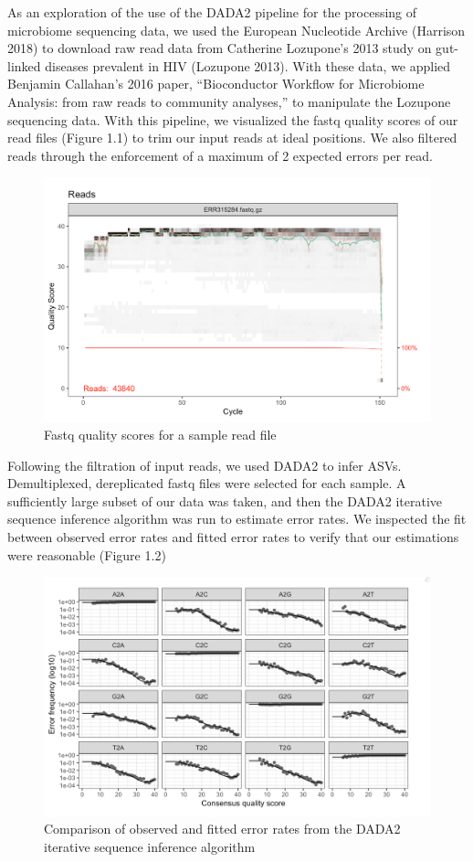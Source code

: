 \documentclass[12pt,twoside]{dukestatscithesis}
\begin{document}
As an exploration of the use of the DADA2 pipeline for the processing of
microbiome sequencing data, we used the European Nucleotide Archive
(Harrison 2018) to download raw read data from Catherine Lozupone's 2013
study on gut-linked diseases prevalent in HIV (Lozupone 2013). With
these data, we applied Benjamin Callahan's 2016 paper, ``Bioconductor
Workflow for Microbiome Analysis: from raw reads to community
analyses,'' to manipulate the Lozupone sequencing data. With this
pipeline, we visualized the fastq quality scores of our read files
(Figure 1.1) to trim our input reads at ideal positions. We also
filtered reads through the enforcement of a maximum of 2 expected errors
per read.
\begin{figure}
\includegraphics[width=700px]{figure/figure1} \caption{Fastq quality scores for a sample read file}\label{fig:figure1}
\end{figure}
Following the filtration of input reads, we used DADA2 to infer ASVs.
Demultiplexed, dereplicated fastq files were selected for each sample. A
sufficiently large subset of our data was taken, and then the DADA2
iterative sequence inference algorithm was run to estimate error rates.
We inspected the fit between observed error rates and fitted error rates
to verify that our estimations were reasonable (Figure 1.2)
\begin{figure}
\includegraphics[width=700px]{figure/figure2} \caption{Comparison of observed and fitted error rates from the DADA2 iterative sequence inference algorithm}\label{fig:figure2}
\end{figure}
\end{document}
